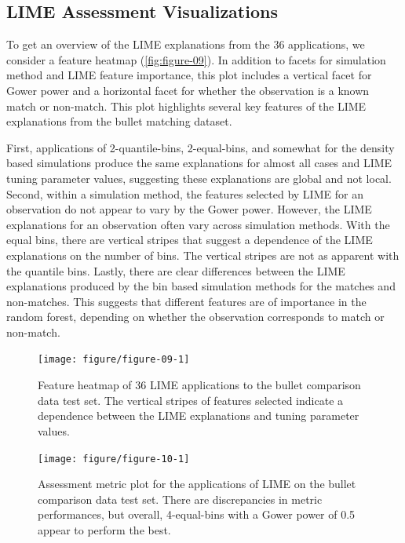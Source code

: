 \documentclass[AMS,STIX2COL]{WileyNJD-v2}\usepackage[]{graphicx}\usepackage[]{color}
\newenvironment{knitrout}{}{} %
\begin{document}
\subsection{LIME Assessment Visualizations} \label{bullet-assess-ex}

To get an overview of the LIME explanations from the 36 applications, we consider a feature heatmap (\autoref{fig:figure-09}). In addition to facets for simulation method and LIME feature importance, this plot includes a vertical facet for Gower power and a horizontal facet for whether the observation is a known match or non-match. This plot highlights several key features of the LIME explanations from the bullet matching dataset.

First, applications of 2-quantile-bins, 2-equal-bins, and somewhat for the density based simulations produce the same explanations for almost all cases and LIME tuning parameter values, suggesting these explanations are global and not local. Second, within a simulation method, the features selected by LIME for an observation do not appear to vary by the Gower power. However, the LIME explanations for an observation often vary across simulation methods. With the equal bins, there are vertical stripes that suggest a dependence of the LIME explanations on the number of bins. The vertical stripes are not as apparent with the quantile bins. Lastly, there are clear differences between the LIME explanations produced by the bin based simulation methods for the matches and non-matches. This suggests that different features are of importance in the random forest, depending on whether the observation corresponds to match or non-match.

\begin{figure}[!thp]
\begin{knitrout}
\color{fgcolor}

{\centering \texttt{[image: figure/figure-09-1]} 

}



\end{knitrout}
\caption{Feature heatmap of 36 LIME applications to the bullet comparison data test set.  The vertical stripes of features selected indicate a dependence between the LIME explanations and tuning parameter values.}
\label{fig:figure-09}

\vspace*{\floatsep}

\begin{knitrout}
\color{fgcolor}

{\centering \texttt{[image: figure/figure-10-1]} 

}



\end{knitrout}
\caption{Assessment metric plot for the applications of LIME on the bullet comparison data test set. There are discrepancies in metric performances, but  overall, 4-equal-bins with a Gower power of 0.5 appear to perform the best.}
\label{fig:figure-10}
\end{figure}
\end{document}

